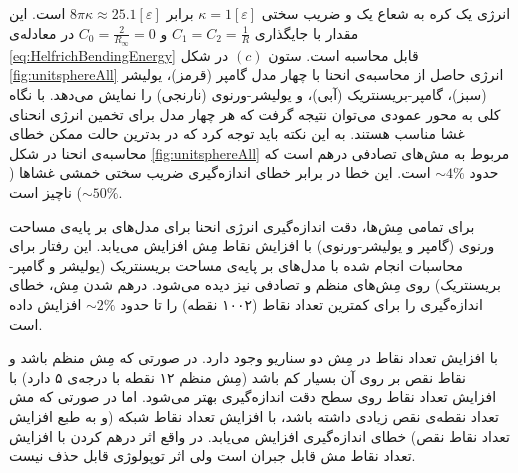
انرژی یک کره‌ به شعاع یک و ضریب سختی 
$\kappa=1[\varepsilon]$
برابر 
$8\pi\kappa\approx 25.1[\varepsilon]$
است. این مقدار با جایگذاری 
$C_1=C_2=\frac{1}{R}$
و
$C_0=\frac{2}{R_\infty}=0$
در معادله‌ی 
\ref{eq:HelfrichBendingEnergy}
قابل محاسبه‌ است. ستون 
$(c)$
 در شکل 
\ref{fig:unitsphereAll}
انرژی حاصل از محاسبه‌ی انحنا با چهار مدل گامپر (قرمز)، یولیشر (سبز)، گامپر-بریسنتریک (آبی)، و یولیشر-ورنوی (نارنجی) را نمایش می‌دهد. با نگاه کلی به محور عمودی می‌توان نتیجه گرفت که هر چهار مدل برای تخمین انرژی انحنای غشا مناسب هستند. به این نکته باید توجه کرد که در بدترین حالت ممکن خطای محاسبه‌ی انحنا در شکل 
\ref{fig:unitsphereAll}
مربوط به مش‌های تصادفی درهم است که حدود
$\sim4\%$
است. این خطا در برابر خطای اندازه‌گیری ضریب سختی خمشی غشا‌ها 
($\sim50\%$)
 ناچیز است.

برای تمامی مِش‌ها، دقت اندازه‌گیری انرژی انحنا برای مدل‌های بر پایه‌ی مساحت ورنوی (گامپر و یولیشر-ورنوی) با افزایش نقاط مِش افزایش می‌یابد. این رفتار برای محاسبات انجام شده با مدل‌های بر پایه‌ی مساحت بریسنتریک (یولیشر و گامپر-بریسنتریک) روی مِش‌های منظم و تصادفی نیز دیده می‌شود. درهم شدن مِش، خطای اندازه‌‌گیری را برای کمترین تعداد نقاط (۱۰۰۲ نقطه) را تا حدود 
$\sim2\%$
افزایش داده است. 

با افزایش تعداد نقاط در مِش دو سناریو وجود دارد. در صورتی که مِش‌ منظم باشد و نقاط نقص بر روی آن بسیار کم باشد (مِش منظم ۱۲ نقطه با درجه‌ی ۵ دارد) با افزایش تعداد نقاط روی سطح دقت اندازه‌گیری بهتر می‌شود. اما در صورتی که مش تعداد نقطه‌ی نقص زیادی داشته باشد، با افزایش تعداد نقاط شبکه (و به طبع افزایش تعداد نقاط نقص) خطای اندازه‌گیری افزایش می‌یابد. در واقع اثر درهم کردن با افزایش تعداد نقاط مش قابل جبران است ولی اثر توپولوژی قابل حذف نیست.



